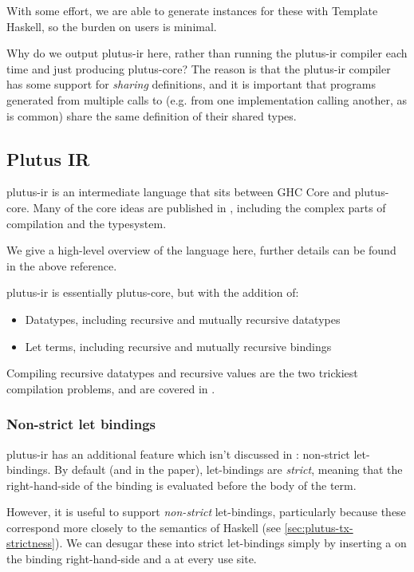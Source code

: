 With some effort, we are able to generate instances for these with Template Haskell, so the burden on users is minimal.

Why do we output \gls{plutus-ir} here, rather than running the \gls{plutus-ir} compiler each time and just producing \gls{plutus-core}?
The reason is that the \gls{plutus-ir} compiler has some support for \emph{sharing} definitions, and it is important that programs generated from multiple calls to  (e.g. from one implementation calling another, as is common) share the same definition of their shared types.

\subsection{Plutus IR}
\label{sec:plutus-ir}

\Gls{plutus-ir} is an intermediate language that sits between GHC Core and \gls{plutus-core}.
Many of the core ideas are published in \textcite{peytonjones2019unraveling}, including the complex parts of compilation and the typesystem.

We give a high-level overview of the language here, further details can be found in the above reference.

\Gls{plutus-ir} is essentially \gls{plutus-core}, but with the addition of:
\begin{itemize}
\item Datatypes, including recursive and mutually recursive datatypes
\item Let terms, including recursive and mutually recursive bindings
\end{itemize}

Compiling recursive datatypes and recursive values are the two trickiest compilation problems, and are covered in \textcite{peytonjones2019unraveling}.

\subsubsection{Non-strict let bindings}
\label{sec:pir-non-strict}

\Gls{plutus-ir} has an additional feature which isn't discussed in \textcite{peytonjones2019unraveling}: non-strict let-bindings.
By default (and in the paper), let-bindings are \emph{strict}, meaning that the right-hand-side of the binding is evaluated before the body of the term.

However, it is useful to support \emph{non-strict} let-bindings, particularly because these correspond more closely to the semantics of Haskell (see \cref{sec:plutus-tx-strictness}).
We can desugar these into strict let-bindings simply by inserting a  on the binding right-hand-side and a  at every use site.


